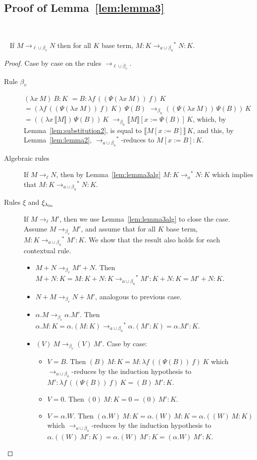 \documentclass{LMCS}
\newcommand{\recap}[2]{\medskip\noindent{\bf #1 \ref{#2}.}~}
\newcommand{\lalin}{\ensuremath{\lambda_{{\it lin}}}}
\newcommand{\xto}[1]{\ensuremath{\rightarrow_{#1}}}
\newcommand{\tolinred}{\xto{\ell}}
\newcommand{\stoalgred}{\ensuremath{\xto{a}^{\ast}}}
\newcommand{\tobv}{\xto{\beta_v}}
\newcommand{\tobn}{\xto{\beta_n}}
\newcommand{\toblinred}{\xto{\ell\cup\beta_v}}
\newcommand{\tobalgred}{\xto{a\cup\beta_n}}
\newcommand{\stobalgred}{\ensuremath{\xto{a\cup\beta_n}^{\ast}}}
\newcommand{\wt}[1]{\llbracket{#1}\rrbracket}
\begin{document}
\subsection{Proof of Lemma~\ref{lem:lemma3}}\label{proof:lemma3}~

\recap{Lemma}{lem:lemma3}
If $M\toblinred N$ then for all $K$ base term, $M:K\stobalgred N:K$.
\begin{proof}
  Case by case on the rules $\toblinred$.
  \begin{description}
    \item[Rule $\beta_v$]
      $(\lambda x\ M)\ B :K$
      $=B : \lambda f\,((\Psi(\lambda x\ M))~f)~K$
      $=(\lambda f\,((\Psi(\lambda x\ M))~f)~K)~\Psi(B)$
      $\tobn((\Psi(\lambda x\,M))\,\Psi(B))\,K$
      $=((\lambda x\,\wt{M})\,\Psi(B))\,K$
      $\tobn\wt{M}[x:=\Psi(B)]\,K$,
      which, by Lemma~\ref{lem:substitution2}, is equal to
      $\wt{M[x:=B]}\,K$, and this, by Lemma~\ref{lem:lemma2},
      \stobalgred-reduces to
      $M[x:=B]:K$.
    \item[Algebraic rules] If $M\tolinred N$, then by Lemma~\ref{lem:lemma3alg} $M:K\stoalgred N:K$ which implies that $M:K\stobalgred N:K$.
    \item[Rules $\xi$ and $\xi_{\lalin}$] If $M\tolinred M'$, then we use Lemma~\ref{lem:lemma3alg} to close the case. 
      Assume $M\tobv M'$, and assume that for all $K$ base term, $M:K\stobalgred M':K$. We show that the result also holds for each contextual rule.
      \begin{itemize}
	\item $M+N\tobv M'+N$. Then $M+N:K=M:K+N:K\stobalgred M':K+N:K=M'+N:K$.
	\item $N+M\tobv N+M'$, analogous to previous case.
	\item $\alpha.M\tobv\alpha.M'$. Then $\alpha.M:K=\alpha.(M:K)\stobalgred \alpha.(M':K)=\alpha.M':K$.
	\item $(V)~M\tobv (V)~M'$. Case by case:
	  \begin{itemize}
	    \item $V=B$.  Then $(B)~M:K = M: \lambda f\,((\Psi(B))~f)~K$ which $\tobalgred $-reduces by the induction hypothesis to $M': \lambda f\,((\Psi(B))~f)~K =(B)~M': K$.
	    \item $V=0$. Then $(0)~M:K = 0 = (0)~M':K$.
	    \item $V=\alpha.W$. Then $(\alpha.W)~M  : K = \alpha.(W)~M : K=\alpha.((W)~M :K)$  which $\tobalgred $-reduces by the induction hypothesis to $\alpha.((W)~M':K) = \alpha.(W)~M':K=(\alpha.W)~M':K$.

\end{itemize}
\end{itemize}
\end{description}
\end{proof}
\end{document}

